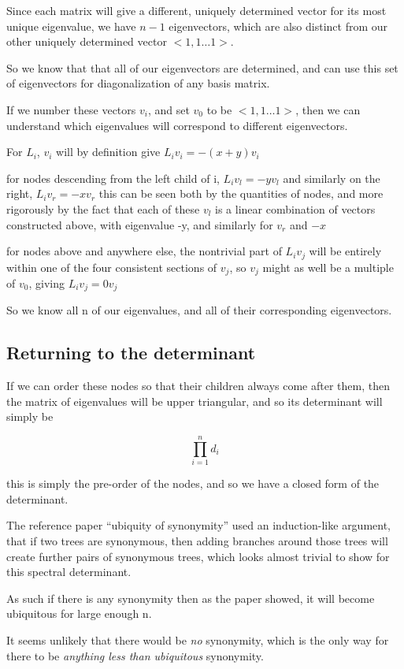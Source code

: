 \documentclass{report}
\begin{document}
Since each matrix will give a different, uniquely determined vector for its
most unique eigenvalue, we have $n-1$ eigenvectors, which are also distinct from
our other uniquely determined vector $<1, 1\ldots 1>$.

So we know that that all of our eigenvectors are determined, and can use this
set of eigenvectors for diagonalization of any basis matrix.


If we number these vectors $v_i$, and set $v_0$ to be $<1, 1\ldots 1>$, then we can
understand which eigenvalues will correspond to different eigenvectors.

For $L_i$, $v_i$ will by definition give $L_i v_i = -(x+y) v_i$

for nodes descending from the left child of i, $L_i v_l = -y v_l$
and similarly on the right, $L_i v_r = -x v_r$
this can be seen both by the quantities of nodes, and more rigorously by the
fact that each of these $v_l$ is a linear combination of vectors constructed
above, with eigenvalue -y, and similarly for $v_r$ and $-x$

for nodes above and anywhere else, the nontrivial part of $L_i v_j$ will be
entirely within one of the four consistent sections of $v_j$, so $v_j$ might as
well be a multiple of $v_0$, giving $L_i v_j = 0 v_j$

So we know all n of our eigenvalues, and all of their corresponding
eigenvectors.


\subsection{Returning to the determinant}


If we can order these nodes so that their children always come after them, then
the matrix of eigenvalues will be upper triangular, and so its determinant will
simply be

\[\prod_{i=1}^n d_i\]

this is simply the pre-order of the nodes, and so we have a closed form of the
determinant.

The reference paper ``ubiquity of synonymity'' used an induction-like argument,
that if two trees are synonymous, then adding branches around those trees will
create further pairs of synonymous trees, which looks almost trivial to show
for this spectral determinant.

As such if there is any synonymity then as the paper showed, it will become
ubiquitous for large enough n.

It seems unlikely that there would be \emph{no} synonymity, which is the only way
for there to be \emph{anything less than ubiquitous} synonymity.
\end{document}
